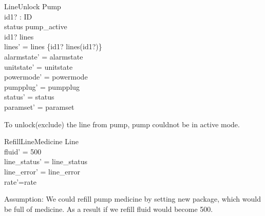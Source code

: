 \documentclass{article}
\begin{document}
	\begin{schema}{LineUnlock}
		\Delta Pump \\
		id1? : ID \\
	\where
		 status \neq pump\_active \\
		id1? \in \dom lines \\
		lines' = lines \setminus \{id1? \mapsto lines(id1?)\} \\
    	alarmstate' = alarmstate \\
    	unitstate' = unitstate \\
    	powermode' = powermode \\
    	pumpplug' = pumpplug \\
    	status' = status \\
    	paramset' = paramset
	\end{schema}
	To unlock(exclude) the line from pump, pump couldnot be in active mode.

	\begin{schema}{RefillLineMedicine}
		\Delta Line \\
	\where
	    fluid' = 500 \\
	    line\_status' = line\_status \\
		line\_error' = line\_error \\
		rate'=rate
	\end{schema}
	Assumption: We could refill pump medicine by setting new package, which would be full of medicine. As a result if we refill fluid would become 500.
	
\end{document}
